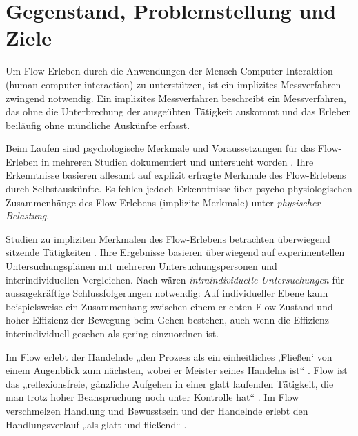

\section{Gegenstand, Problemstellung und Ziele} 

\label{sec:gegenstand_problemstellung_und_ziele}

Um Flow-Erleben durch die Anwendungen der Mensch-Computer-Interaktion (human-computer interaction) zu unterstützen, ist ein implizites Messverfahren zwingend notwendig. Ein implizites Messverfahren beschreibt ein Messverfahren, das ohne die Unterbrechung der ausgeübten Tätigkeit auskommt und das Erleben beiläufig ohne mündliche Auskünfte erfasst.

Beim Laufen sind psychologische Merkmale und Voraussetzungen für das Flow-Erleben in mehreren Studien dokumentiert und untersucht worden \citep{Stoll2005, Reinhardt2006, Schuler2009, Jimenez-Torres2013}. Ihre Erkenntnisse basieren allesamt auf explizit erfragte Merkmale des Flow-Erlebens durch Selbstauskünfte. Es fehlen jedoch Erkenntnisse über psycho-physiologischen Zusammenhänge des Flow-Erlebens (implizite Merkmale) unter \emph{physischer Belastung}. 

Studien zu impliziten Merkmalen des Flow-Erlebens betrachten überwiegend sitzende Tätigkeiten \citep{deManzano2010, Keller2011, Peifer2014, Tozman2015, Harmat2015}. Ihre Ergebnisse basieren überwiegend auf experimentellen Untersuchungsplänen mit mehreren Untersuchungspersonen und interindividuellen Vergleichen. Nach \citet[][S.77]{Henk2014} wären \emph{intraindividuelle Untersuchungen} für aussagekräftige Schlussfolgerungen notwendig: Auf individueller Ebene kann beispielsweise ein Zusammenhang zwischen einem erlebten Flow-Zustand und hoher Effizienz der Bewegung beim Gehen bestehen, auch wenn die Effizienz interindividuell gesehen als gering einzuordnen ist.

Im Flow erlebt der Handelnde „den Prozess als ein einheitliches ‚Fließen‘ von einem Augenblick zum nächsten, wobei er Meister seines Handelns ist“ \citep[][S.~59]{Csikszentmihalyi2010}. Flow ist das „reflexionsfreie, gänzliche Aufgehen in einer glatt laufenden Tätigkeit, die man trotz hoher Beanspruchung noch unter Kontrolle hat“ \citep[][S.~156]{Rheinberg2003}. Im Flow verschmelzen Handlung und Bewusstsein und der Handelnde erlebt den Handlungsverlauf „als glatt und fließend“ \citep[][S.~13]{Henk2014}.

